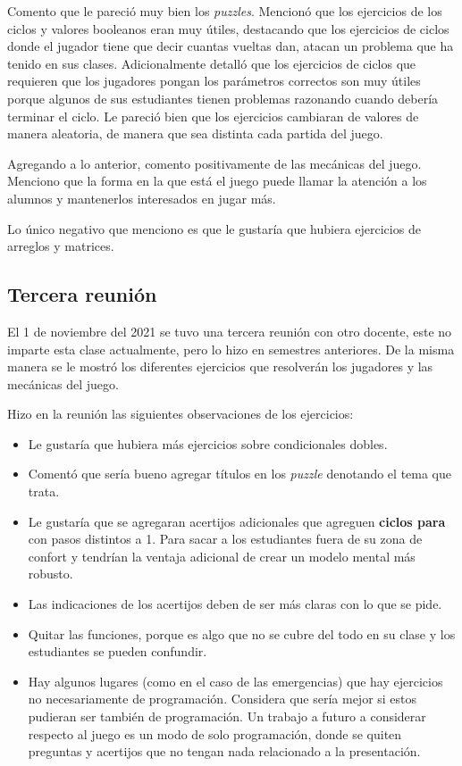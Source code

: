 Comento que le pareció muy bien los \textit{puzzles}. Mencionó que los ejercicios de los ciclos y valores booleanos eran muy útiles, destacando que los ejercicios de ciclos donde el jugador tiene que decir cuantas vueltas dan, atacan un problema que ha tenido en sus clases. Adicionalmente detalló que los ejercicios de ciclos que requieren que los jugadores pongan los parámetros correctos son muy útiles porque algunos de sus estudiantes tienen problemas razonando cuando debería terminar el ciclo. Le pareció bien que los ejercicios cambiaran de valores de manera aleatoria, de manera que sea distinta cada partida del juego. 

Agregando a lo anterior, comento positivamente de las mecánicas del juego. Menciono que la forma en la que está el juego puede llamar la atención a los alumnos y mantenerlos interesados en jugar más.

Lo único negativo que menciono es que le gustaría que hubiera ejercicios de arreglos y matrices.

\subsection{Tercera reunión}
El 1 de noviembre del 2021 se tuvo una tercera reunión con otro docente, este no imparte esta clase actualmente, pero lo hizo en semestres anteriores. De la misma manera se le mostró los diferentes ejercicios que resolverán los jugadores y las mecánicas del juego.

Hizo en la reunión las siguientes observaciones de los ejercicios:
\begin{itemize}
    \item Le gustaría que hubiera más ejercicios sobre condicionales dobles.
    \item Comentó que sería bueno agregar títulos en los \textit{puzzle} denotando el tema que trata.
    \item Le gustaría que se agregaran acertijos adicionales que agreguen \textbf{ciclos para} con pasos distintos a 1. Para sacar a los estudiantes fuera de su zona de confort y tendrían la ventaja adicional de crear un modelo mental más robusto.
    \item Las indicaciones de los acertijos deben de ser más claras con lo que se pide.
    \item Quitar las funciones, porque es algo que no se cubre del todo en su clase y los estudiantes se pueden confundir.
    \item Hay algunos lugares (como en el caso de las emergencias) que hay ejercicios no necesariamente de programación. Considera que sería mejor si estos pudieran ser también de programación. Un trabajo a futuro a considerar respecto al juego es un modo de solo programación, donde se quiten preguntas y acertijos que no tengan nada relacionado a la presentación.
\end{itemize}

